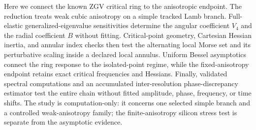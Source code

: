 Here we connect the known ZGV critical ring to the anisotropic endpoint.  The
reduction treats weak cubic anisotropy on a simple tracked Lamb branch.
Full-elastic generalized-eigenvalue sensitivities determine the angular
coefficient \(V_4\) and the radial coefficient \(B\) without fitting.
Critical-point geometry, Cartesian Hessian inertia, and annular index
checks then test the alternating local Morse set and its perturbative
scaling inside a declared local annulus.  Uniform Bessel asymptotics connect
the ring response to the isolated-point regime, while the fixed-anisotropy
endpoint retains exact critical frequencies and Hessians.  Finally, validated
spectral computations and an accumulated inter-resolution phase-discrepancy
estimator test the entire chain without fitted amplitude, phase, frequency, or
time shifts.  The study is
computation-only: it concerns one selected simple branch and a controlled
weak-anisotropy family; the finite-anisotropy silicon stress test is separate
from the asymptotic evidence.
